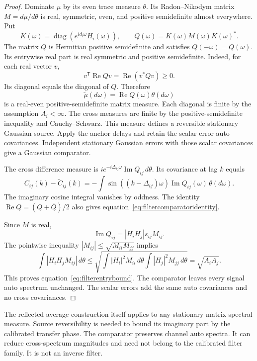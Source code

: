 \begin{proof}
Dominate $\mu$ by its even trace measure $\theta$. Its Radon--Nikodym
matrix $M=d\mu/d\theta$ is real, symmetric, even, and positive semidefinite
almost everywhere. Put
\[
 K(\omega)=\operatorname{diag}(e^{id_i\omega}H_i(\omega)),\qquad
 Q(\omega)=K(\omega)M(\omega)K(\omega)^*.
\]
The matrix $Q$ is Hermitian positive semidefinite and satisfies
$Q(-\omega)=\overline{Q(\omega)}$. Its entrywise real part is real
symmetric and positive semidefinite. Indeed, for each real vector $v$,
\[
 v^{\mathsf T}\operatorname{Re}Qv=\operatorname{Re}(v^*Qv)\ge0.
\]
Its diagonal equals the diagonal of $Q$. Therefore
\[
 \widetilde\mu(d\omega)=\operatorname{Re}Q(\omega)\theta(d\omega)
\]
is a real-even positive-semidefinite matrix measure. Each diagonal is
finite by the assumption $A_i<\infty$. The cross measures are finite by
the positive-semidefinite inequality and Cauchy--Schwarz. This measure
defines a reversible stationary Gaussian source. Apply the anchor delays
and retain the scalar-error auto covariances. Independent stationary
Gaussian errors with those scalar covariances give a Gaussian comparator.

The cross difference measure is
$i e^{-i\Delta_{ij}\omega}\operatorname{Im}Q_{ij}\,d\theta$.
Its covariance at lag $k$ equals
\begin{equation}\label{eq:filtererrorintegral}
 C_{ij}(k)-\widetilde C_{ij}(k)=
 -\int\sin((k-\Delta_{ij})\omega)
       \operatorname{Im}Q_{ij}(\omega)\,\theta(d\omega).
\end{equation}
The imaginary cosine integral vanishes by oddness. The identity
$\operatorname{Re}Q=(Q+\overline Q)/2$ also gives
equation~\eqref{eq:filtercomparatoridentity}.

Since $M$ is real,
\[
 \operatorname{Im}Q_{ij}=|H_iH_j|s_{ij}M_{ij}.
\]
The pointwise inequality $|M_{ij}|\le\sqrt{M_{ii}M_{jj}}$ implies
\[
 \int |H_iH_jM_{ij}|\,d\theta
 \le\sqrt{\int |H_i|^2M_{ii}\,d\theta
                \int |H_j|^2M_{jj}\,d\theta}
 =\sqrt{A_iA_j}.
\]
This proves equation~\eqref{eq:filterentrybound}. The comparator leaves
every signal auto spectrum unchanged. The scalar errors add the same auto
covariances and no cross covariances.
\end{proof}

The reflected-average construction itself applies to any stationary
matrix spectral measure. Source reversibility is needed to bound its
imaginary part by the calibrated transfer phase. The comparator preserves
channel auto spectra. It can reduce cross-spectrum magnitudes and need
not belong to the calibrated filter family. It is not an inverse filter.

